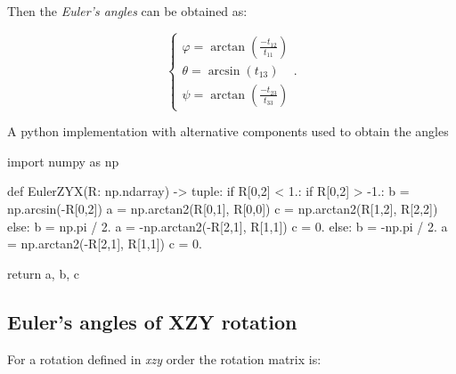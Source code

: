         Then the \textit{Euler's angles} can be obtained as:

        \begin{equation}
            \left\{ \begin{array}{l}
                \varphi = \arctan \left( \frac{-t_{12}}{t_{11}} \right)\\
                \theta = \arcsin \left( t_{13} \right) \\
                \psi = \arctan \left( \frac{-t_{23}}{t_{33}} \right)
            \end{array} \right.
        .\end{equation}

        A python implementation with alternative components used to obtain the angles
\begin{python}
import numpy as np

def EulerZYX(R: np.ndarray) -> tuple:
    if R[0,2] < 1.:
        if R[0,2] > -1.:
            b = np.arcsin(-R[0,2])
            a = np.arctan2(R[0,1], R[0,0])
            c = np.arctan2(R[1,2], R[2,2])
        else:
            b = np.pi / 2.
            a = -np.arctan2(-R[2,1], R[1,1])
            c = 0.
    else:
        b = -np.pi / 2.
        a = np.arctan2(-R[2,1], R[1,1])
        c = 0.

    return a, b, c
\end{python}


\subsection{Euler's angles of \textbf{XZY} rotation}

        For a rotation defined in \textit{xzy} order the rotation matrix is:

